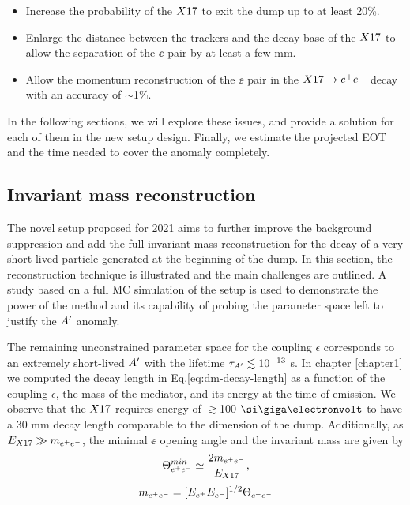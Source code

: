 \begin{itemize}
\item Increase the probability of the $X17$ to exit the dump up to at least 20\%.
\item Enlarge the distance between the trackers and the decay base of the $X17$ to allow the separation of the $\ee$ pair by at least a few mm.
\item Allow the momentum reconstruction of the $\ee$ pair in the $X17 \rightarrow e^+ e^-$ decay with an accuracy of $\sim$1\%.
\end{itemize}

In the following sections, we will explore these issues, and provide a solution for each of them in the new setup design. Finally, we estimate the projected  EOT and the time needed to cover the anomaly completely.

\subsection{Invariant mass reconstruction}
\label{ch5:sec:new-vismode-setup-invmass}

The novel setup proposed for 2021 aims to further improve the background suppression and add the full invariant mass reconstruction for the decay of a very short-lived particle generated at the beginning of the dump. In this section, the reconstruction technique is illustrated and the main challenges are outlined. A study based on a full MC simulation of the setup is used to demonstrate the power of the method and its capability of probing the parameter space left to justify the $A'$ anomaly.

The remaining unconstrained parameter space for the coupling $\epsilon$ corresponds to an extremely short-lived $A'$ with the lifetime $\tau_{A'} \lesssim 10^{-13}$ s. In chapter \ref{chapter1} we computed the decay length in Eq.\ref{eq:dm-decay-length} as a function of the coupling $\epsilon$, the mass of the mediator, and its energy at the time of emission.
We observe that the $X17$ requires energy of $\gtrsim$100 $\gev$ to have a 30 mm decay length comparable to the dimension of the dump.
Additionally, as $E_{X17} \gg m_{e^+e^-}$, the minimal $\ee$ opening angle and the invariant mass are given by
\begin{equation} 
\Theta_{ e^+e^-}^{min} \simeq  \frac{2m_{e^+e^-}}{E_{X17}},
\label{eqn:angle}
\end{equation}
\begin{equation}
m_{e^+e^-} = [E_{e^+} E_{e^-}]^{1/2} \Theta_{ e^+e^-}
\label{eqn:imass}
\end{equation}

